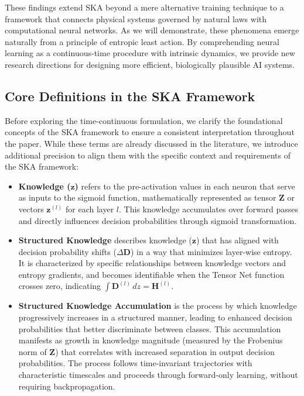 \documentclass{article}
\begin{document}
\indent These findings extend SKA beyond a mere alternative training technique to a framework that connects physical systems governed by natural laws with computational neural networks. As we will demonstrate, these phenomena emerge naturally from a principle of entropic least action. By comprehending neural learning as a continuous-time procedure with intrinsic dynamics, we provide new research directions for designing more efficient, biologically plausible AI systems.

\subsection{Core Definitions in the SKA Framework}
Before exploring the time-continuous formulation, we clarify the foundational concepts of the
SKA framework to ensure a consistent interpretation throughout the paper. While these terms are already discussed in the literature, we introduce additional precision to align them with the specific context and requirements of the SKA framework:
	
	\begin{itemize}
		\item \textbf{Knowledge ($\mathbf{z}$)} refers to the pre-activation values in each neuron that serve as inputs to the sigmoid function, mathematically represented as tensor $\mathbf{Z}$ or vectors $\mathbf{z}^{(l)}$ for each layer $l$. This knowledge accumulates over forward passes and directly influences decision probabilities through sigmoid transformation.
		
		\item \textbf{Structured Knowledge} describes knowledge ($\mathbf{z}$) that has aligned with decision probability shifts ($\Delta\mathbf{D}$) in a way that minimizes layer-wise entropy. It is characterized by specific relationships between knowledge vectors and entropy gradients, and becomes identifiable when the Tensor Net function crosses zero, indicating $\int \mathbf{D}^{(l)} \, dz = \mathbf{H}^{(l)}$.
		
		\item \textbf{Structured Knowledge Accumulation} is the process by which knowledge progressively increases in a structured manner, leading to enhanced decision probabilities that better discriminate between classes. This accumulation manifests as growth in knowledge magnitude (measured by the Frobenius norm of $\mathbf{Z}$) that correlates with increased separation in output decision probabilities. The process follows time-invariant trajectories with characteristic timescales and proceeds through forward-only learning, without requiring backpropagation.
		\end{itemize}
	
\end{document}
